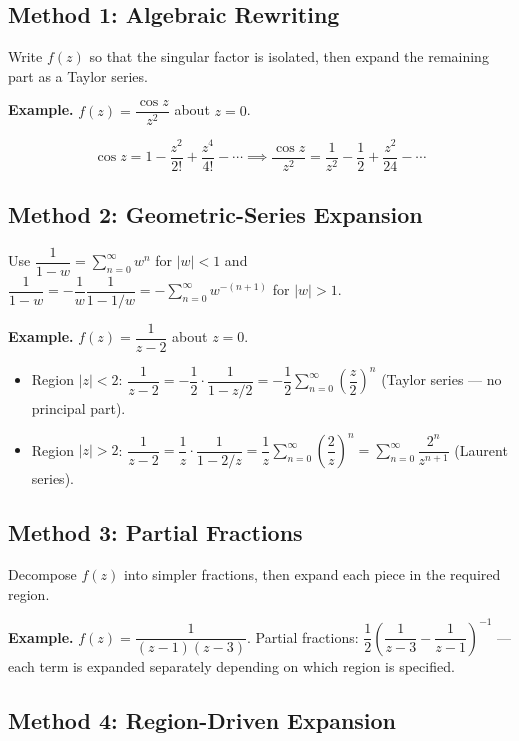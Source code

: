 \documentclass[12pt,a4paper]{article}
\begin{document}
\subsection*{Method 1: Algebraic Rewriting}

Write $f(z)$ so that the singular factor is isolated, then expand the remaining part as a
Taylor series.

\textbf{Example.} $f(z) = \dfrac{\cos z}{z^2}$ about $z=0$.

\[
  \cos z = 1 - \frac{z^2}{2!} + \frac{z^4}{4!} - \cdots
  \implies
  \frac{\cos z}{z^2} = \frac{1}{z^2} - \frac{1}{2} + \frac{z^2}{24} - \cdots
\]

\subsection*{Method 2: Geometric-Series Expansion}

Use $\dfrac{1}{1-w} = \sum_{n=0}^{\infty} w^n$ for $|w|<1$
and $\dfrac{1}{1-w} = -\dfrac{1}{w}\dfrac{1}{1-1/w}
= -\sum_{n=0}^{\infty} w^{-(n+1)}$ for $|w|>1$.

\textbf{Example.} $f(z)=\dfrac{1}{z-2}$ about $z=0$.

\begin{itemize}
  \item Region $|z|<2$: $\dfrac{1}{z-2} = -\dfrac{1}{2}\cdot\dfrac{1}{1-z/2}
        = -\dfrac{1}{2}\sum_{n=0}^{\infty}\left(\dfrac{z}{2}\right)^n$
        (Taylor series --- no principal part).
  \item Region $|z|>2$: $\dfrac{1}{z-2} = \dfrac{1}{z}\cdot\dfrac{1}{1-2/z}
        = \dfrac{1}{z}\sum_{n=0}^{\infty}\left(\dfrac{2}{z}\right)^n
        = \sum_{n=0}^{\infty}\dfrac{2^n}{z^{n+1}}$ (Laurent series).
\end{itemize}

\subsection*{Method 3: Partial Fractions}

Decompose $f(z)$ into simpler fractions, then expand each piece in the required region.

\textbf{Example.} $f(z)=\dfrac{1}{(z-1)(z-3)}$. Partial fractions:
$\dfrac{1}{2}\left(\dfrac{1}{z-3}-\dfrac{1}{z-1}\right)^{-1}$
--- each term is expanded separately depending on which region is specified.

\subsection*{Method 4: Region-Driven Expansion}
\end{document}
